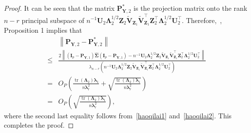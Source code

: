 \documentclass[10pt]{book}
\theoremstyle{definition}
\DeclareMathOperator{\mytr}{tr}
\newcommand{\bZ}{\mathbf{Z}}
\newcommand{\bP}{\mathbf{P}}
\newcommand{\bY}{\mathbf{Y}}
\newcommand{\bI}{\mathbf{I}}
\newcommand{\bU}{\mathbf{U}}
\newcommand{\bV}{\mathbf{V}}
\newcommand{\bfsym}[1]{\ensuremath{\boldsymbol{#1}}}
\def\blambda {\bfsym {\lambda}}
\def\bLambda {\bfsym {\Lambda}}
\def\bSigma {\bfsym {\Sigma}}
\begin{document}
\begin{proof}
    It can be seen that the matrix $
    \bP_{\bY,2}^*
            $ is the projection matrix onto the rank $n-r$ principal subspace of $n^{-1}\bU_2 \bLambda_2^{1/2} \bZ_2 \tilde{\bV}_{\bZ_1}\tilde{\bV}_{\bZ_1}^\top  \bZ_2^\top \bLambda_2^{1/2} \bU_2^\top$.
            Therefore,~\cite{Cai2015Optimal}, Proposition 1 implies that
    \begin{equation*}
        \begin{split}
            &\left\|\bP_{\bY,2}-
            \bP_{\bY,2}^*
            \right\|
            \\
             \leq&
             \frac{
                 2\left\|(\bI_p -\bP_{\bY,1})\hat{\bSigma}(\bI_p -\bP_{\bY,1})
             -
         n^{-1}\bU_2 \bLambda_2^{1/2} \bZ_2 \tilde{\bV}_{\bZ_1}\tilde{\bV}_{\bZ_1}^\top  \bZ_2^\top \bLambda_2^{1/2} \bU_2^\top
             \right\|
         }{
        \lambda_{n-r}\left(
            n^{-1}\bU_2 \bLambda_2^{1/2} \bZ_2 \tilde{\bV}_{\bZ_1}\tilde{\bV}_{\bZ_1}^\top  \bZ_2^\top \bLambda_2^{1/2} \bU_2^\top
        \right)
    }
    \\
    = &
    O_P\left(
        \frac{\mytr(\bLambda_2) \blambda_1}{n\blambda_r^2}
        +
        \sqrt{\frac{\mytr(\bLambda_2) \blambda_1}{n\blambda_r^2}}
    \right)
    \\
    = &
    O_P\left(
        \sqrt{\frac{\mytr(\bLambda_2) \blambda_1}{n\blambda_r^2}}
    \right)
    ,
        \end{split}
    \end{equation*}
    where the second last equality follows from~\eqref{haoqilai1} and~\eqref{haoqilai2}.
    This completes the proof.
\end{proof}
\end{document}
